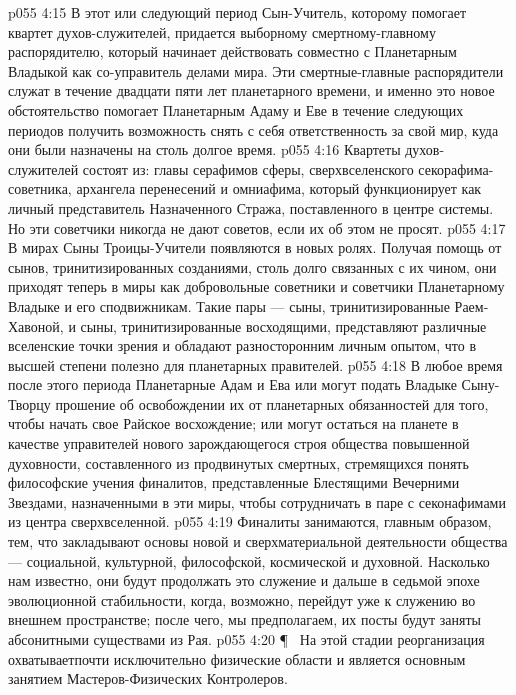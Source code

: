 \vs p055 4:15 В этот или следующий период Сын\hyp{}Учитель, которому помогает квартет духов\hyp{}служителей, придается выборному смертному\hyp{}главному распорядителю, который начинает действовать совместно с Планетарным Владыкой как со\hyp{}управитель делами мира. Эти смертные\hyp{}главные распорядители служат в течение двадцати пяти лет планетарного времени, и именно это новое обстоятельство помогает Планетарным Адаму и Еве в течение следующих периодов получить возможность снять с себя ответственность за свой мир, куда они были назначены на столь долгое время.
\vs p055 4:16 Квартеты духов\hyp{}служителей состоят из: главы серафимов сферы, сверхвселенского секорафима\hyp{}советника, архангела перенесений и омниафима, который функционирует как личный представитель Назначенного Стража, поставленного в центре системы. Но эти советчики никогда не дают советов, если их об этом не просят.
\vs p055 4:17 \bibnobreakspace {} В мирах Сыны Троицы\hyp{}Учители появляются в новых ролях. Получая помощь от сынов, тринитизированных созданиями, столь долго связанных с их чином, они приходят теперь в миры как добровольные советники и советчики Планетарному Владыке и его сподвижникам. Такие пары --- сыны, тринитизированные Раем\hyp{}Хавоной, и сыны, тринитизированные восходящими, представляют различные вселенские точки зрения и обладают разносторонним личным опытом, что в высшей степени полезно для планетарных правителей.
\vs p055 4:18 В любое время после этого периода Планетарные Адам и Ева или могут подать Владыке Сыну\hyp{}Творцу прошение об освобождении их от планетарных обязанностей для того, чтобы начать свое Райское восхождение; или могут остаться на планете в качестве управителей нового зарождающегося строя общества повышенной духовности, составленного из продвинутых смертных, стремящихся понять философские учения финалитов, представленные Блестящими Вечерними Звездами, назначенными в эти миры, чтобы сотрудничать в паре с секонафимами из центра сверхвселенной.
\vs p055 4:19 Финалиты занимаются, главным образом, тем, что закладывают основы новой и сверхматериальной деятельности общества --- социальной, культурной, философской, космической и духовной. Насколько нам известно, они будут продолжать это служение и дальше в седьмой эпохе эволюционной стабильности, когда, возможно, перейдут уже к служению во внешнем пространстве; после чего, мы предполагаем, их посты будут заняты абсонитными существами из Рая.
\vs p055 4:20 \P\ \bibnobreakspace {} На этой стадии реорганизация охватываетпочти исключительно физические области и является основным занятием Мастеров\hyp{}Физических Контролеров.
